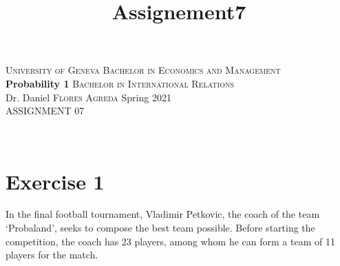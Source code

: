 \documentclass[12pt,thmsa]{article}\usepackage[]{graphicx}\usepackage[]{color}
\title{Assignement7}
\begin{document}
\noindent \textsc{University of Geneva}     \hfill \textsc{Bachelor in Economics and Management} \\
\textbf{Probability 1}                      \hfill \textsc{Bachelor in International Relations} \\
Dr. Daniel \textsc{Flores Agreda}                 \hfill Spring 2021  \\
ASSIGNMENT 07



\noindent
\makebox[\linewidth]{\rule{\textwidth}{0.4pt}}\\[1.5ex]


\section*{Exercise 1}

In the final football tournament, Vladimir Petkovic, the coach of the team `Probaland', seeks to compose the best team possible. Before starting the competition, the coach has 23 players, among whom he can form a team of 11 players for the match.
\medskip
\end{document}
